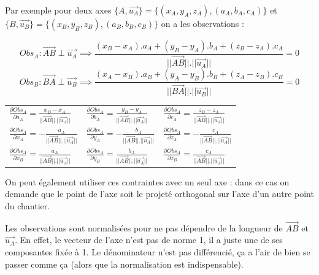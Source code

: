 \documentclass[french]{report}
\begin{document}
Par exemple pour deux axes $\{A,\overrightarrow{u_A}\} =\{(x_A,y_A,z_A), (a_A,b_A,c_A)\}$ et $\{B,\overrightarrow{u_B}\} =\{(x_B,y_B,z_B), (a_B,b_B,c_B)\}$ on a les observations :

$$ Obs_A : \overrightarrow{AB} \perp \overrightarrow{u_A} \implies \frac{(x_B-x_A).a_A + (y_B-y_A).b_A + (z_B-z_A).c_A}{||\overrightarrow{AB}||.||\overrightarrow{u_A}||} = 0 $$
$$ Obs_B : \overrightarrow{BA} \perp \overrightarrow{u_B} \implies \frac{(x_A-x_B).a_B + (y_A-y_B).b_B + (z_A-z_B).c_B}{||\overrightarrow{BA}||.||\overrightarrow{u_B}||} = 0 $$

\begin{tabular}{l l l}
$\frac{\partial{Obs_A}}{\partial{a_A}}       = \frac{x_B-x_A}{||\overrightarrow{AB}||.||\overrightarrow{u_A}||} $ &
$\frac{\partial{Obs_A}}{\partial{b_A}}       = \frac{y_B-y_A}{||\overrightarrow{AB}||.||\overrightarrow{u_A}||} $ &
$\frac{\partial{Obs_A}}{\partial{c_A}}       = \frac{z_B-z_A}{||\overrightarrow{AB}||.||\overrightarrow{u_A}||} $ \\[0.3cm]

$\frac{\partial{Obs_A}}{\partial{x_A}}       = -\frac{a_A}{||\overrightarrow{AB}||.||\overrightarrow{u_A}||} $ &
$\frac{\partial{Obs_A}}{\partial{y_A}}       = -\frac{b_A}{||\overrightarrow{AB}||.||\overrightarrow{u_A}||} $ &
$\frac{\partial{Obs_A}}{\partial{z_A}}       = -\frac{c_A}{||\overrightarrow{AB}||.||\overrightarrow{u_A}||} $ \\[0.3cm]

$\frac{\partial{Obs_A}}{\partial{x_B}}       = \frac{a_A}{||\overrightarrow{AB}||.||\overrightarrow{u_A}||} $ &
$\frac{\partial{Obs_A}}{\partial{y_B}}       = \frac{b_A}{||\overrightarrow{AB}||.||\overrightarrow{u_A}||} $ &
$\frac{\partial{Obs_A}}{\partial{z_B}}       = \frac{c_A}{||\overrightarrow{AB}||.||\overrightarrow{u_A}||} $ \\[0.6cm]

\end{tabular}

On peut également utiliser ces contraintes avec un seul axe : dans ce cas on demande que le point de l'axe soit le projeté orthogonal sur l'axe d'un autre point du chantier.


Les observations sont normalisées pour ne pas dépendre de la longueur de $\overrightarrow{AB}$ et $\overrightarrow{u_A}$. En effet, le vecteur de l'axe n'est pas de norme 1, il a juste une de ses composantes fixée à 1.
Le dénominateur n'est pas différencié, ça a l'air de bien se passer comme ça (alors que la normalisation est indispensable).
\end{document}
